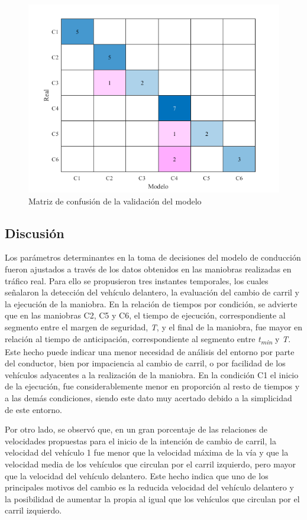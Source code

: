 \newpage
\begin{figure}[h]
    \centering
    \includegraphics[width=12cm]
    {figures/5.11.png}
    \caption{ \label{fig:5.11} Matriz de confusión de la validación del modelo}
\end{figure}

\subsection{Discusión}
Los parámetros determinantes en la toma de decisiones del modelo de conducción fueron ajustados a través de los datos obtenidos en las maniobras realizadas en tráfico real. Para ello se propusieron tres instantes temporales, los cuales señalaron la detección del vehículo delantero, la evaluación del cambio de carril y la ejecución de la maniobra. En la relación de tiempos por condición, se advierte que en las maniobras C2, C5 y C6, el tiempo de ejecución, correspondiente al segmento entre el margen de seguridad, \emph{T}, y el final de la maniobra, fue mayor en relación al tiempo de anticipación, correspondiente al segmento entre \emph{t\textsubscript{min}} y \emph{T}. Este hecho puede indicar una menor necesidad de análisis del entorno por parte del conductor, bien por impaciencia al cambio de carril, o por facilidad de los vehículos adyacentes a la realización de la maniobra. En la condición C1 el inicio de la ejecución, fue considerablemente menor en proporción al resto de tiempos y a las demás condiciones, siendo este dato muy acertado debido a la simplicidad de este entorno. 

Por otro lado, se observó que, en un gran porcentaje de las relaciones de velocidades propuestas para el inicio de la intención de cambio de carril, la velocidad del vehículo 1 fue menor que la velocidad máxima de la vía y que la velocidad media de los vehículos que circulan por el carril izquierdo, pero mayor que la velocidad del vehículo delantero. Este hecho indica que uno de los principales motivos del cambio es la reducida velocidad del vehículo delantero y la posibilidad de aumentar la propia al igual que los vehículos que circulan por el carril izquierdo.  

